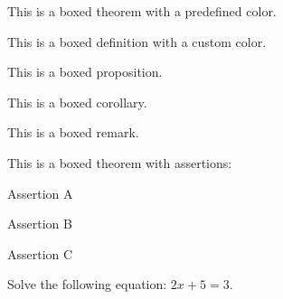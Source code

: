 \usepackage{coursetemp}

\begin{theorem}
    This is a boxed theorem with a predefined color.
    \end{theorem}
    
    \begin{definition}
    This is a boxed definition with a custom color.
    \end{definition}
    
    \begin{proposition}
    This is a boxed proposition.
    \end{proposition}
    
    \begin{corollary}
    This is a boxed corollary.
    \end{corollary}
    \begin{remark}
    This is a boxed remark.
    \end{remark}
    \begin{theorem}
        This is a boxed theorem with assertions:
        \begin{assertions}
            \item Assertion A
            \item Assertion B
            \item Assertion C
        \end{assertions}
    \end{theorem}
    \begin{exercise}
        Solve the following equation: \(2x+5=3\).
    \end{exercise}
